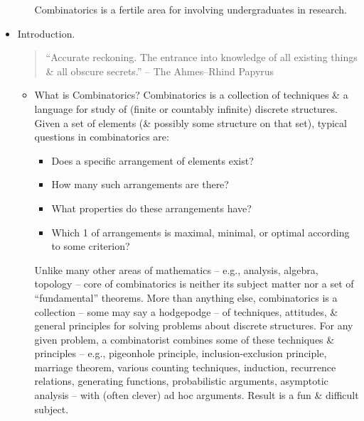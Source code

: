 \documentclass{article}
\begin{document}
\begin{itemize}
\begin{itemize}
		Combinatorics is a fertile area for involving undergraduates in research.
	\end{itemize}
	\item {\sf Introduction.}
	\begin{quote}
		``Accurate reckoning. The entrance into knowledge of all existing things \& all obscure secrets.'' -- The Ahmes--Rhind Papyrus
	\end{quote}
	\begin{itemize}
		\item {\sf What is Combinatorics?} Combinatorics is a collection of techniques \& a language for study of (finite or countably infinite) discrete structures. Given a set of elements (\& possibly some structure on that set), typical questions in combinatorics are:
		\begin{itemize}
			\item Does a specific arrangement of elements exist?
			\item How many such arrangements are there?
			\item What properties do these arrangements have?
			\item Which 1 of arrangements is maximal, minimal, or optimal according to some criterion?
		\end{itemize}
		Unlike many other areas of mathematics -- e.g., analysis, algebra, topology -- core of combinatorics is neither its subject matter nor a set of ``fundamental'' theorems. More than anything else, combinatorics is a collection -- some may say a hodgepodge -- of techniques, attitudes, \& general principles for solving problems about discrete structures. For any given problem, a combinatorist combines some of these techniques \& principles -- e.g., pigeonhole principle, inclusion-exclusion principle, marriage theorem, various counting techniques, induction, recurrence relations, generating functions, probabilistic arguments, asymptotic analysis -- with (often clever) ad hoc arguments. Result is a fun \& difficult subject.
		

\end{itemize}
\end{itemize}
\end{document}
